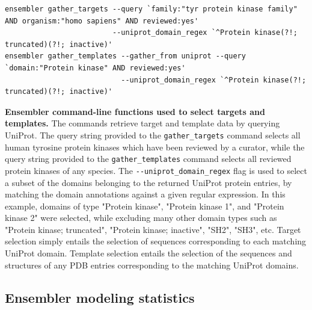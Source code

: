 \documentclass[aps,pre,twocolumn,nofootinbib,superscriptaddress,linenumbers]{revtex4-1}
\begin{document}
\begin{codebox*}[tbp]
\scriptsize
\begin{Verbatim}[frame=single]
ensembler gather_targets --query `family:"tyr protein kinase family" AND organism:"homo sapiens" AND reviewed:yes'
                         --uniprot_domain_regex `^Protein kinase(?!; truncated)(?!; inactive)'
ensembler gather_templates --gather_from uniprot --query `domain:"Protein kinase" AND reviewed:yes'
                           --uniprot_domain_regex `^Protein kinase(?!; truncated)(?!; inactive)'
\end{Verbatim}
\caption{{\bf Ensembler command-line functions used to select targets and templates.}
The commands retrieve target and template data by querying UniProt.
The query string provided to the {\tt gather\_targets} command selects all human tyrosine protein kinases which have been reviewed by a curator, while the query string provided to the {\tt gather\_templates} command selects all reviewed protein kinases of any species.
The {\tt-{}-uniprot\_domain\_regex} flag is used to select a subset of the domains belonging to the returned UniProt protein entries, by matching the domain annotations against a given regular expression.
In this example, domains of type "Protein kinase", "Protein kinase 1", and "Protein kinase 2" were selected, while excluding many other domain types such as "Protein kinase; truncated", "Protein kinase; inactive", "SH2", "SH3", etc.
Target selection simply entails the selection of sequences corresponding to each matching UniProt domain.
Template selection entails the selection of the sequences and structures of any PDB entries corresponding to the matching UniProt domains.
}
\label{box:tk-gather-targets-templates}
\end{codebox*}

\subsection*{Ensembler modeling statistics}
\end{document}
